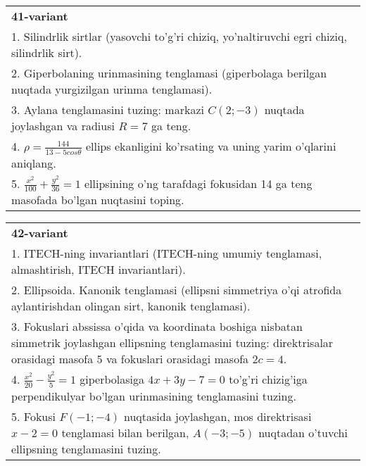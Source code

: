 \documentclass{article}
\begin{document}
\begin{tabular}{m{17cm}}
\textbf{41-variant}\\
1. Silindrlik sirtlar (yasovchi to'g'ri chiziq, yo'naltiruvchi egri chiziq, silindrlik sirt).\\

2. Giperbolaning urinmasining tenglamasi (giperbolaga berilgan nuqtada yurgizilgan urinma tenglamasi).\\

3. Aylana tenglamasini tuzing: markazi $C(2;-3)$ nuqtada joylashgan va radiusi $R=7$ ga teng.\\

4. $\rho = \frac{144}{13 - 5cos\theta}$ ellips ekanligini ko'rsating va uning yarim o'qlarini aniqlang.\\

5. $\frac{x^{2}}{100} + \frac{y^{2}}{36} = 1$ ellipsining o'ng tarafdagi fokusidan 14 ga teng masofada bo'lgan nuqtasini toping.  
\end{tabular}
\vspace{1cm}


\begin{tabular}{m{17cm}}
\textbf{42-variant}\\
1. ITECH-ning invariantlari (ITECH-ning umumiy tenglamasi, almashtirish, ITECH invariantlari).\\

2. Ellipsoida. Kanonik tenglamasi (ellipsni simmetriya o'qi atrofida aylantirishdan olingan sirt, kanonik tenglamasi).\\

3. Fokuslari abssissa o'qida va koordinata boshiga nisbatan simmetrik joylashgan ellipsning tenglamasini tuzing: direktrisalar orasidagi masofa $5$ va fokuslari orasidagi masofa $2c=4$.\\

4. $\frac{x^{2}}{20} - \frac{y^{2}}{5} = 1$ giperbolasiga $4x + 3y - 7 = 0$ to'g'ri chizig'iga perpendikulyar bo'lgan urinmasining tenglamasini tuzing.  \\

5. Fokusi $F( - 1; - 4)$ nuqtasida joylashgan, mos direktrisasi $x - 2 = 0$ tenglamasi bilan berilgan, $A( - 3; - 5)$ nuqtadan o'tuvchi ellipsning tenglamasini tuzing.  
\end{tabular}
\vspace{1cm}
\end{document}
